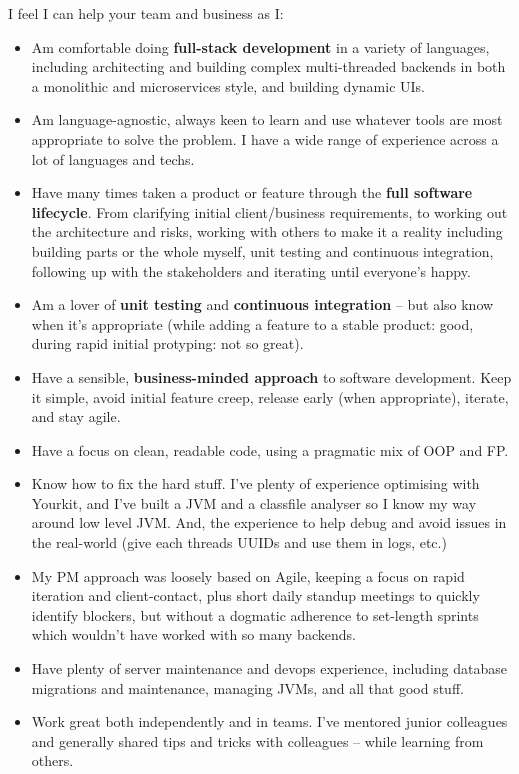 \par{
I feel I can help your team and business as I:
                      \begin{itemize}
\item Am comfortable doing \textbf{full-stack development} in a variety of languages, including architecting and building complex multi-threaded backends in both a monolithic and microservices style, and building dynamic UIs.  

\item Am language-agnostic, always keen to learn and use whatever tools are most appropriate to solve the problem.  I have a wide range of experience across a lot of languages and techs.

\item Have many times taken a product or feature through the \textbf{full software lifecycle}.  From clarifying initial client/business requirements, to working out the architecture and risks, working with others to make it a reality including building parts or the whole myself, unit testing and continuous integration, following up with the stakeholders and iterating until everyone's happy.

\item Am a lover of \textbf{unit testing} and \textbf{continuous integration} – but also know when it's appropriate (while adding a feature to a stable product: good, during rapid initial protyping: not so great). 

\item Have a sensible,\textbf{ business-minded approach} to software development.  Keep it simple, avoid initial feature creep, release early (when appropriate), iterate, and stay agile. 

\item Have a focus on clean, readable code, using a pragmatic mix of OOP and FP.

\item Know how to fix the hard stuff.  I've plenty of experience optimising with Yourkit, and I've built a JVM and a classfile analyser so I know my way around low level JVM.  And, the experience to help debug and avoid issues in the real-world (give each threads UUIDs and use them in logs, etc.)

\item My PM approach was loosely based on Agile, keeping a focus on rapid iteration and client-contact, plus short daily standup meetings to quickly identify blockers, but without a dogmatic adherence to set-length sprints which wouldn't have worked with so many backends.
                        
\item Have plenty of server maintenance and devops experience, including database migrations and maintenance, managing JVMs, and all that good stuff.

\item Work great both independently and in teams.  I've mentored junior colleagues and generally shared tips and tricks with colleagues – while learning from others.
\end{itemize}
}